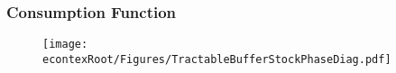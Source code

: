 \begin{frame}
\frametitle{\textbf{Consumption Function}}

\begin{figure}
\texttt{[image: \\econtexRoot/Figures/TractableBufferStockPhaseDiag.pdf]}
\end{figure}
\end{frame}
